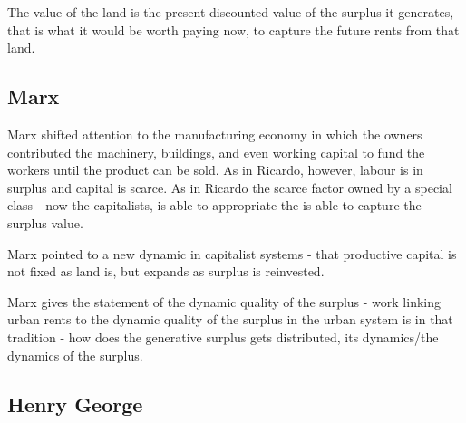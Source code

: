 The value of the land is the present discounted value of the surplus it generates, that is what it would be worth paying now, to capture the future rents from that land.


\subsection{Marx}



 Marx shifted attention to the manufacturing economy in which the owners contributed the machinery, buildings, and even working capital to fund the workers until the product can be sold. %
As in Ricardo, however, labour is in surplus and capital is scarce. As in Ricardo the scarce factor owned by a special class - now the capitalists, is able to appropriate the is able to capture the surplus value. %

Marx pointed to a new dynamic in capitalist systems - that productive capital is not fixed as land is, but  expands as surplus is reinvested. %

Marx gives the statement of the dynamic quality of the surplus
- work linking urban rents to the dynamic quality of the surplus in the urban system is in that tradition 
- how does the generative surplus gets distributed, its dynamics/the dynamics of the surplus. 
 
\subsection{Henry George} 


